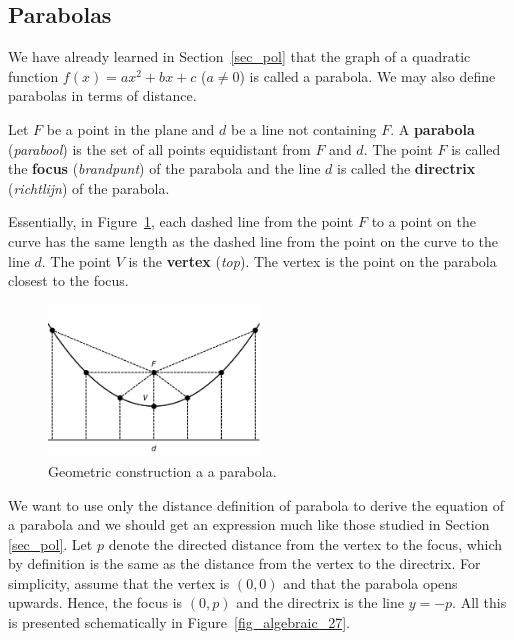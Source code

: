 \subsection{Parabolas}

We have already learned in Section~\ref{sec_pol} that the graph of a quadratic function $f(x) = ax^2 + bx + c$ ($a \neq 0$) is called a parabola.  We may also define parabolas in terms of distance.

\begin{definition}[Parabola]

\label{paraboladefn}

Let $F$ be a point in the plane and $d$ be a line not containing $F$. A \textbf{parabola} (\textit{parabool}) is the set of all points equidistant from $F$ and $d$.  The point $F$ is called the \textbf{focus} (\textit{brandpunt}) of the parabola and the line $d$ is called the \textbf{directrix} (\textit{richtlijn}) of the parabola.
\end{definition}

Essentially, in Figure~\ref{fig_algebraic_26}, each dashed line from the point $F$ to a point on the curve has the same length as the dashed line from the point on the curve to the line $d$.  The point $V$ is the \textbf{vertex} (\textit{top}).  The   vertex is the point on the parabola closest to the focus.



\begin{figure}
	\begin{center}
			\includegraphics[width=0.5\textwidth]{fig_algebraic_26}
	\caption{Geometric construction a a parabola.}
	\label{fig_algebraic_26}
	\end{center}
\end{figure}

\ifcourse
We want to use only the distance definition of parabola to derive the equation of a parabola and we should get an expression much like those studied in Section \ref{sec_pol}.  Let $p$ denote the directed distance from the vertex to the focus, which by definition is the same as the distance from the vertex to the directrix.  For simplicity, assume that the vertex is $(0,0)$ and that the parabola opens upwards.  Hence, the focus is $(0,p)$ and the directrix is the line $y = -p$. All this is presented schematically in Figure~\ref{fig_algebraic_27}.
\fi

